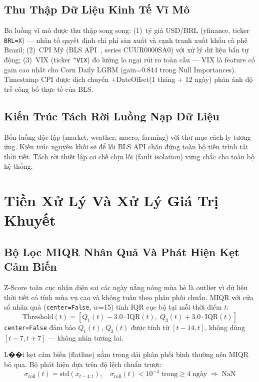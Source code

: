 \documentclass[conference]{IEEEtran}
\begin{document}
\subsection{Thu Thập Dữ Liệu Kinh Tế Vĩ Mô}

Ba luồng vĩ mô được thu thập song song: (1)~tỷ giá USD/BRL (yfinance,
ticker \texttt{BRL=X}) — nhân tố quyết định chi phí sản xuất và cạnh tranh
xuất khẩu cà phê Brazil; (2)~CPI Mỹ (BLS API~\cite{bls2026}, series
CUUR0000SA0) với xử lý dữ liệu bẩn tự động; (3)~VIX (ticker
\texttt{\^{}VIX}) đo lường lo ngại rủi ro toàn cầu — VIX là feature có gain
cao nhất cho Corn Daily LGBM (gain=0.844 trong Null Importances). Timestamp
CPI được dịch chuyển $+$DateOffset(1 tháng $+$ 12 ngày) phản ánh độ trễ
công bố thực tế của BLS.

\subsection{Kiến Trúc Tách Rời Luồng Nạp Dữ Liệu}

Bốn luồng độc lập (market, weather, macro, farming) với thư mục cách ly
tương ứng. Kiến trúc nguyên khối sẽ để lỗi BLS API chặn đứng toàn bộ tiến
trình tải thời tiết. Tách rời thiết lập cơ chế chịu lỗi (fault isolation)
vững chắc cho toàn bộ hệ thống.

\section{Tiền Xử Lý Và Xử Lý Giá Trị Khuyết}

\subsection{Bộ Lọc MIQR Nhân Quả Và Phát Hiện Kẹt Cảm Biến}

Z-Score toàn cục nhận diện sai các ngày nắng nóng mùa hè là outlier vì dữ
liệu thời tiết có tính mùa vụ cao và không tuân theo phân phối chuẩn.
MIQR với cửa sổ nhân quả (\texttt{center=False}, $w$=15) tính IQR cục bộ
tại mỗi thời điểm $t$:
\begin{equation}
\text{Threshold}(t) = [Q_1(t) - 3.0\cdot\text{IQR}(t),\;
                        Q_3(t) + 3.0\cdot\text{IQR}(t)]
\end{equation}
\texttt{center=False} đảm bảo $Q_1(t)$, $Q_3(t)$ được tính từ $[t{-}14, t]$,
không dùng $[t{-}7, t{+}7]$ — không nhìn tương lai.

L��i kẹt cảm biến (flatline) nằm trong dải phân phối bình thường nên MIQR bỏ
qua. Bộ phát hiện dựa trên độ lệch chuẩn trượt:
\begin{equation}
\sigma_\text{roll}(t) = \text{std}(x_{t-4:t}), \quad
\sigma_\text{roll}(t) < 10^{-4}\;\text{trong} \geq 4\;\text{ngày}
\;\Rightarrow\; \text{NaN}
\end{equation}
\end{document}
